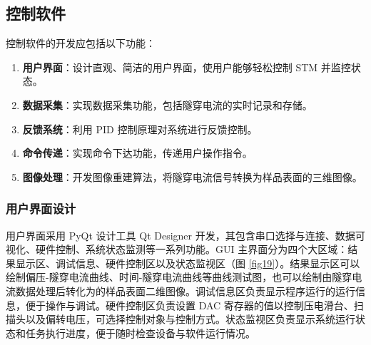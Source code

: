 \documentclass{article}
\begin{document}
\begin{spacing}{1.625}
\begin{enumerate}
		\end{enumerate}
		
	
	
	
	
	
	\subsection{控制软件}
		控制软件的开发应包括以下功能：
		\begin{enumerate}
			\item \textbf{用户界面}：设计直观、简洁的用户界面，使用户能够轻松控制 STM 并监控状态。
			\item \textbf{数据采集}：实现数据采集功能，包括隧穿电流的实时记录和存储。
			\item \textbf{反馈系统}：利用 PID 控制原理对系统进行反馈控制。
			\item \textbf{命令传递}：实现命令下达功能，传递用户操作指令。
			\item \textbf{图像处理}：开发图像重建算法，将隧穿电流信号转换为样品表面的三维图像。
		\end{enumerate}
	
	
	\subsubsection{用户界面设计}
		用户界面采用 PyQt 设计工具 Qt Designer 开发，其包含串口选择与连接、数据可视化、硬件控制、系统状态监测等一系列功能。GUI 主界面分为四个大区域：结果显示区、调试信息、硬件控制区以及状态监视区（图 \ref{fig19}）。结果显示区可以绘制偏压-隧穿电流曲线、时间-隧穿电流曲线等曲线测试图，也可以绘制由隧穿电流数据处理后转化为的样品表面二维图像。调试信息区负责显示程序运行的运行信息，便于操作与调试。硬件控制区负责设置 DAC 寄存器的值以控制压电滑台、扫描头以及偏转电压，可选择控制对象与控制方式。状态监视区负责显示系统运行状态和任务执行进度，便于随时检查设备与软件运行情况。
		
		\begin{figure}[!h]
			\centering
\end{figure}
\end{spacing}
\end{document}
